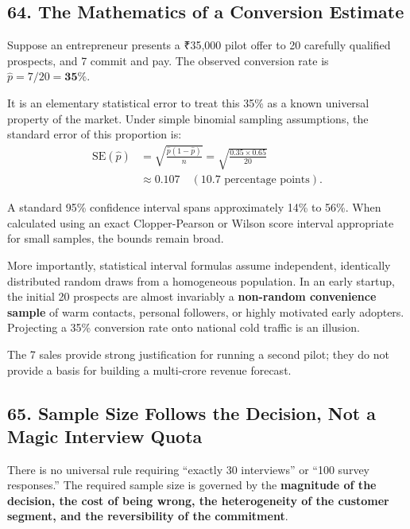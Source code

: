 \subsection*{64. The Mathematics of a Conversion Estimate}

Suppose an entrepreneur presents a ₹35,000 pilot offer to 20 carefully qualified prospects, and 7 commit and pay. The observed conversion rate is $\hat{p} = 7 / 20 = \mathbf{35\%}$.

It is an elementary statistical error to treat this 35\% as a known universal property of the market. Under simple binomial sampling assumptions, the standard error of this proportion is:
\begin{equation}
\begin{aligned}
\text{SE}(\hat{p}) &= \sqrt{\frac{\hat{p}(1 - \hat{p})}{n}} = \sqrt{\frac{0.35 \times 0.65}{20}} \\
&\approx \mathbf{0.107} \quad (10.7\text{ percentage points}).
\end{aligned}
\end{equation}

A standard 95\% confidence interval spans approximately 14\% to 56\%. When calculated using an exact Clopper-Pearson or Wilson score interval appropriate for small samples, the bounds remain broad.

More importantly, statistical interval formulas assume independent, identically distributed random draws from a homogeneous population. In an early startup, the initial 20 prospects are almost invariably a \textbf{non-random convenience sample} of warm contacts, personal followers, or highly motivated early adopters. Projecting a 35\% conversion rate onto national cold traffic is an illusion.

The 7 sales provide strong justification for running a second pilot; they do not provide a basis for building a multi-crore revenue forecast.

\subsection*{65. Sample Size Follows the Decision, Not a Magic Interview Quota}

There is no universal rule requiring ``exactly 30 interviews'' or ``100 survey responses.'' The required sample size is governed by the \textbf{magnitude of the decision, the cost of being wrong, the heterogeneity of the customer segment, and the reversibility of the commitment}.


